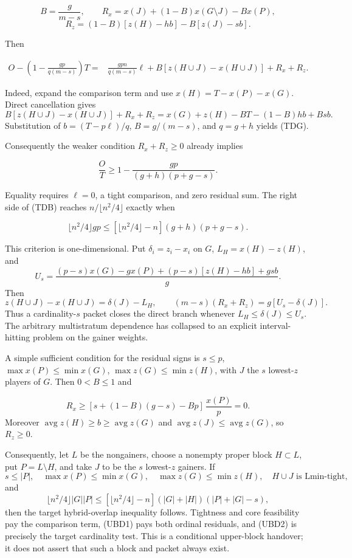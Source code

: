 \documentclass[11pt]{article}
\begin{document}
\[
 B=\frac{g}{m-s},\qquad
 R_x=x(J)+(1-B)x(G\setminus J)-Bx(P),
\]
\[
 R_z=(1-B)[z(H)-hb]-B[z(J)-sb].
\]

Then

\begin{align}
 O-\left(1-\frac{gp}{q(m-s)}\right)T
 ={}&\frac{gpn}{q(m-s)}\ell
 +B[z(H\cup J)-x(H\cup J)]+R_x+R_z.               \tag{TDG}
\end{align}

Indeed, expand the comparison term and use
$x(H)=T-x(P)-x(G)$.  Direct cancellation gives
\[
B[z(H\cup J)-x(H\cup J)]+R_x+R_z
=x(G)+z(H)-BT-(1-B)hb+Bsb.
\]
Substitution of $b=(T-p\ell)/q$, $B=g/(m-s)$, and $q=g+h$ yields (TDG).

Consequently the weaker condition $R_x+R_z\ge0$ already implies

\[
 \frac OT\ge1-\frac{gp}{(g+h)(p+g-s)}.               \tag{TDB}
\]

Equality requires $\ell=0$, a tight comparison, and zero residual sum.
The right side of (TDB) reaches $n/\lfloor n^2/4\rfloor$ exactly when

\[
 \lfloor n^2/4\rfloor gp
 \le[\lfloor n^2/4\rfloor-n](g+h)(p+g-s).           \tag{TDT}
\]

This criterion is one-dimensional.  Put
$\delta_i=z_i-x_i$ on $G$, $L_H=x(H)-z(H)$, and
\[
 U_s=\frac{(p-s)x(G)-gx(P)+(p-s)[z(H)-hb]+gsb}{g}.
\]
Then
\[
 z(H\cup J)-x(H\cup J)=\delta(J)-L_H,\qquad
 (m-s)(R_x+R_z)=g[U_s-\delta(J)].                   \tag{GPI}
\]
Thus a cardinality-$s$ packet closes the direct branch whenever
$L_H\le\delta(J)\le U_s$.  The arbitrary multistratum dependence has
collapsed to an explicit interval-hitting problem on the gainer weights.

A simple sufficient condition for the residual signs is
$s\le p$, $\max x(P)\le\min x(G)$, $\max z(G)\le\min z(H)$, with $J$ the
$s$ lowest-$z$ players of $G$.  Then $0<B\le1$ and

\[
 R_x\ge [s+(1-B)(g-s)-Bp]\,\frac{x(P)}p=0.
\]
Moreover $\operatorname{avg}z(H)\ge b\ge\operatorname{avg}z(G)$ and
$\operatorname{avg}z(J)\le\operatorname{avg}z(G)$, so $R_z\ge0$.

Consequently, let $L$ be the nongainers, choose a nonempty proper block
$H\subset L$, put $P=L\setminus H$, and take $J$ to be the $s$ lowest-$z$
gainers.  If
\[
 s\le |P|,\quad \max x(P)\le\min x(G),\quad
 \max z(G)\le\min z(H),\quad H\cup J\text{ is Lmin-tight},              \tag{UBD1}
\]
and
\[
 \lfloor n^2/4\rfloor |G||P|
 \le [\lfloor n^2/4\rfloor-n](|G|+|H|)(|P|+|G|-s),                    \tag{UBD2}
\]
then the target hybrid-overlap inequality follows.  Tightness and core
feasibility pay the comparison term, (UBD1) pays both ordinal residuals, and
(UBD2) is precisely the target cardinality test.  This is a conditional
upper-block handover; it does not assert that such a block and packet always
exist.
\end{document}
